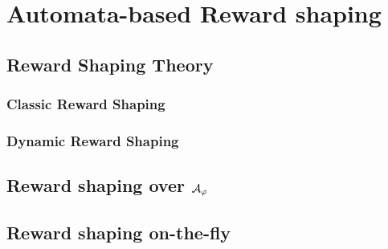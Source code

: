\chapter{Automata-based Reward shaping}

\section{Reward Shaping Theory}
\subsection{Classic Reward Shaping}
\subsection{Dynamic Reward Shaping}
\section{Reward shaping over $\mathcal{A}_\varphi$}
\section{Reward shaping on-the-fly}